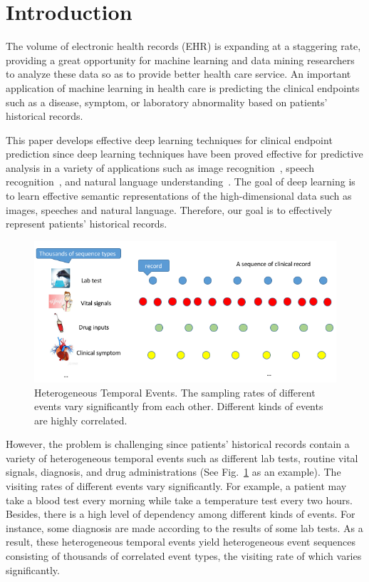 \documentclass[letterpaper]{article} %
\begin{document}
\section{Introduction}

The volume of electronic health records (EHR) is expanding at a staggering rate, providing a great opportunity for machine learning and data mining researchers to analyze these data so as to provide better health care service. An important application of machine learning in health care is predicting the clinical endpoints such as a disease, symptom, or laboratory abnormality based on patients' historical records.  

This paper develops effective deep learning techniques for clinical endpoint prediction since deep learning techniques have been proved effective for predictive analysis in a variety of applications such as image recognition~\cite{he2016deep}, speech recognition~\cite{hinton2012deep}, and natural language understanding~\cite{blunsom2017characters}. The goal of deep learning is to learn effective semantic representations of the high-dimensional data such as images, speeches and natural language. Therefore, our goal is to effectively represent patients' historical records.

\begin{figure}[!t]
\centering
\includegraphics[width=.8\linewidth]{data1.png}

\caption{Heterogeneous Temporal Events. The sampling rates of different events vary significantly from each other. Different kinds of events are highly correlated.}

\label{fig:distr time interval}
\end{figure}

However, the problem is challenging since patients' historical records contain a variety of heterogeneous temporal events such as different lab tests, routine vital signals, diagnosis, and drug administrations (See Fig.~\ref{fig:distr time interval} as an example). The visiting rates of different events vary significantly. For example, a patient may take a blood test every morning while take a temperature test every two hours. Besides, there is a high level of dependency among different kinds of events. For instance, some diagnosis are made according to the results of some lab tests. As a result, these heterogeneous temporal events yield heterogeneous event sequences consisting of thousands of correlated event types, the visiting rate of which varies significantly. 
\end{document}
